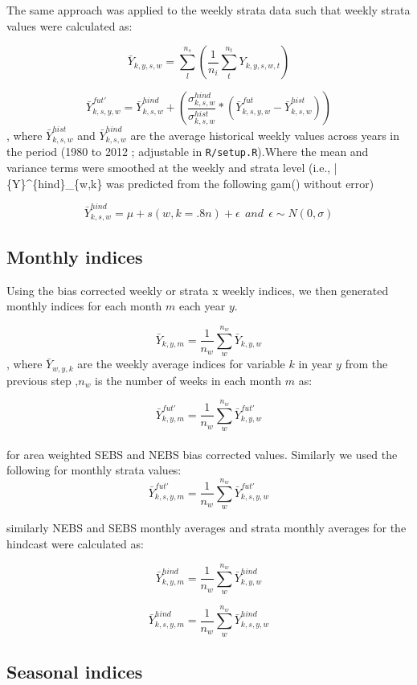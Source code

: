 \documentclass[
]{article}
\begin{document}
The same approach was applied to the weekly strata data such that weekly
strata values were calculated as:

\[\bar{Y}_{k,y,s,w}= \sum^{n_s}_{l}(\frac{1}{n_i}\sum^{n_t}_{t}Y_{k,y,s,w,t})\]

\[\bar{Y}^{fut'}_{k,s,y,w} =\bar{Y}^{hind}_{k,s,w} +\left( \frac{\sigma^{hind}_{k,s,w}}{\sigma^{hist}_{k,s,w}}*(\bar{Y}^{fut}_{k,s,y,w}-\bar{Y}^{hist}_{k,s,w})  \right )\],
where \(\bar{Y}^{hist}_{k,s,w}\) and \(\bar{Y}^{hind}_{k,s,w}\) are the
average historical weekly values across years in the period (1980 to
2012 ; adjustable in \texttt{R/setup.R}).Where the mean and variance
terms were smoothed at the weekly and strata level (i.e.,
\bar\{Y\}\^{}\{hind\}\_\{w,k\} was predicted from the following gam()
without error)

\[ \bar{Y}^{hind}_{k,s,w} = \mu+s(w, k = .8n)+\epsilon ~~and~~\epsilon\sim N(0,\sigma) \]

\hypertarget{monthly-indices}{%
\subsection{Monthly indices}\label{monthly-indices}}

Using the bias corrected weekly or strata x weekly indices, we then
generated monthly indices for each month \(m\) each year \(y\).

\[\bar{Y}_{k,y,m}= \frac{1}{n_w}\sum^{n_w}_{w}\bar{Y}_{k,y,w}\], where
\(\bar{Y}_{w,y,k}\) are the weekly average indices for variable \(k\) in
year \(y\) from the previous step ,\(n_w\) is the number of weeks in
each month \(m\) as:

\[\bar{Y}^{fut'}_{k,y,m} = \frac{1}{n_w}\sum^{n_w}_{w}\bar{Y}^{fut'}_{k,y,w}\]\\
for area weighted SEBS and NEBS bias corrected values. Similarly we used
the following for monthly strata values:\\
\[\bar{Y}^{fut'}_{k,s,y,m} = \frac{1}{n_w}\sum^{n_w}_{w}\bar{Y}^{fut'}_{k,s,y,w}\]

similarly NEBS and SEBS monthly averages and strata monthly averages for
the hindcast were calculated as:

\[\bar{Y}^{hind}_{k,y,m} = \frac{1}{n_w}\sum^{n_w}_{w}\bar{Y}^{hind}_{k,y,w}\]

\[\bar{Y}^{hind}_{k,s,y,m} = \frac{1}{n_w}\sum^{n_w}_{w}\bar{Y}^{hind}_{k,s,y,w}\]

\hypertarget{seasonal-indices}{%
\subsection{Seasonal indices}\label{seasonal-indices}}
\end{document}
